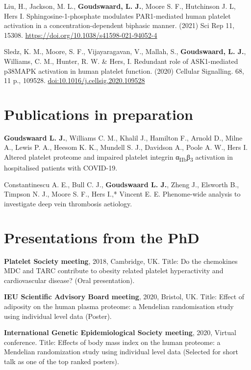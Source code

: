\documentclass[11pt,twoside]{bristolthesis}
\begin{document}
Liu, H., Jackson, M. L., \textbf{Goudswaard, L. J.}, Moore S. F., Hutchinson J. L, Hers I. Sphingosine-1-phosphate modulates PAR1-mediated human platelet activation in a concentration-dependent biphasic manner. (2021) Sci Rep 11, 15308. \url{https://doi.org/10.1038/s41598-021-94052-4}

Sledz, K. M., Moore, S. F., Vijayaragavan, V., Mallah, S., \textbf{Goudswaard, L. J.}, Williams, C. M., Hunter, R. W. \& Hers, I. Redundant role of ASK1-mediated p38MAPK activation in human platelet function. (2020) Cellular Signalling. 68, 11 p., 109528. \url{doi:10.1016/j.cellsig.2020.109528}

\hypertarget{publications-in-preparation}{%
\section{Publications in preparation}\label{publications-in-preparation}}

\textbf{Goudswaard L. J.}, Williams C. M., Khalil J., Hamilton F., Arnold D., Milne A., Lewis P. A., Heesom K. K., Mundell S. J., Davidson A., Poole A. W., Hers I. Altered platelet proteome and impaired platelet integrin α\textsubscript{IIb}β\textsubscript{3} activation in hospitalised patients with COVID-19.

Constantinescu A. E., Bull C. J., \textbf{Goudswaard L. J.}, Zheng J., Elsworth B., Timpson N. J., Moore S. F., Hers I.,* Vincent E. E. Phenome-wide analysis to investigate deep vein thrombosis aetiology.

\hypertarget{presentations-from-the-phd}{%
\section{Presentations from the PhD}\label{presentations-from-the-phd}}

\textbf{Platelet Society meeting}, 2018, Cambridge, UK. Title: Do the chemokines MDC and TARC contribute to obesity related platelet hyperactivity and cardiovascular disease? (Oral presentation).

\textbf{IEU Scientific Advisory Board meeting}, 2020, Bristol, UK. Title: Effect of adiposity on the human plasma proteome: a Mendelian randomisation study using individual level data (Poster).

\textbf{International Genetic Epidemiological Society meeting}, 2020, Virtual conference. Title: Effects of body mass index on the human proteome: a Mendelian randomization study using individual level data (Selected for short talk as one of the top ranked posters).
\end{document}
